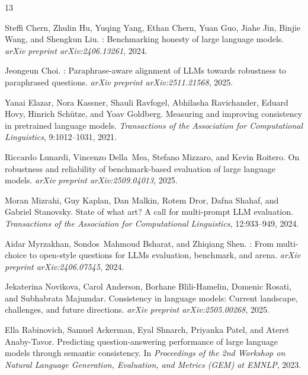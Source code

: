 \documentclass{article}
\begin{document}
\begin{thebibliography}{13}

Steffi Chern, Zhulin Hu, Yuqing Yang, Ethan Chern, Yuan Guo, Jiahe Jin, Binjie Wang, and Shengkun Liu.
: Benchmarking honesty of large language models.
\newblock \emph{arXiv preprint arXiv:2406.13261}, 2024.

Jeongeun Choi.
: Paraphrase-aware alignment of {LLM}s towards robustness to paraphrased questions.
\newblock \emph{arXiv preprint arXiv:2511.21568}, 2025.

Yanai Elazar, Nora Kassner, Shauli Ravfogel, Abhilasha Ravichander, Eduard Hovy, Hinrich Sch{\"u}tze, and Yoav Goldberg.
\newblock Measuring and improving consistency in pretrained language models.
\newblock \emph{Transactions of the Association for Computational Linguistics}, 9:1012--1031, 2021.

Riccardo Lunardi, Vincenzo Della~Mea, Stefano Mizzaro, and Kevin Roitero.
\newblock On robustness and reliability of benchmark-based evaluation of large language models.
\newblock \emph{arXiv preprint arXiv:2509.04013}, 2025.

Moran Mizrahi, Guy Kaplan, Dan Malkin, Rotem Dror, Dafna Shahaf, and Gabriel Stanovsky.
\newblock State of what art? {A} call for multi-prompt {LLM} evaluation.
\newblock \emph{Transactions of the Association for Computational Linguistics}, 12:933--949, 2024.

Aidar Myrzakhan, Sondos~Mahmoud Bsharat, and Zhiqiang Shen.
: From multi-choice to open-style questions for {LLM}s evaluation, benchmark, and arena.
\newblock \emph{arXiv preprint arXiv:2406.07545}, 2024.

Jekaterina Novikova, Carol Anderson, Borhane Blili-Hamelin, Domenic Rosati, and Subhabrata Majumdar.
\newblock Consistency in language models: Current landscape, challenges, and future directions.
\newblock \emph{arXiv preprint arXiv:2505.00268}, 2025.

Ella Rabinovich, Samuel Ackerman, Eyal Shnarch, Priyanka Patel, and Ateret Anaby-Tavor.
\newblock Predicting question-answering performance of large language models through semantic consistency.
\newblock In \emph{Proceedings of the 2nd Workshop on Natural Language Generation, Evaluation, and Metrics (GEM) at EMNLP}, 2023.


\end{thebibliography}
\end{document}
